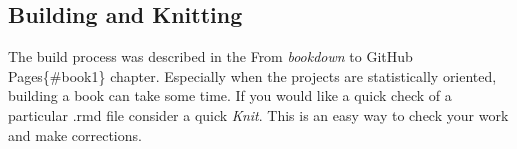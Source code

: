\documentclass[
]{book}
\begin{document}
\hypertarget{building-and-knitting}{%
\subsection{Building and Knitting}\label{building-and-knitting}}

The build process was described in the From \emph{bookdown} to GitHub Pages\{\#book1\} chapter. Especially when the projects are statistically oriented, building a book can take some time. If you would like a quick check of a particular .rmd file consider a quick \emph{Knit}. This is an easy way to check your work and make corrections.

  
\end{document}
